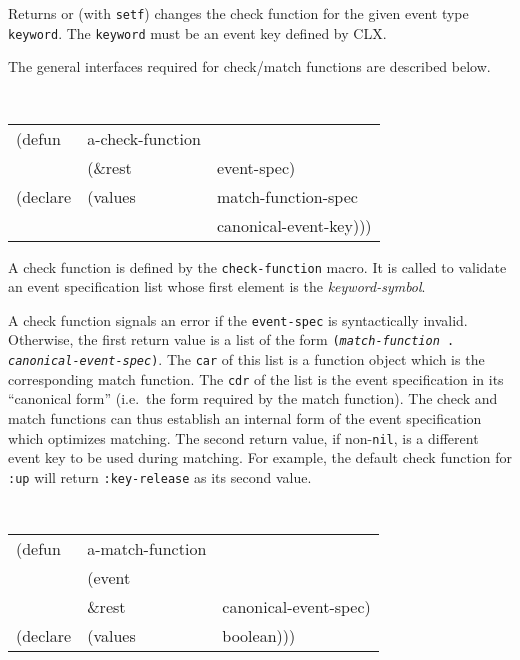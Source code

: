 \documentclass[twoside]{book}
\begin{document}
\begin{sloppy}
{\begin{flushright}
{}\end{flushright}}

\begin{flushright} \parbox[t]{6.125in}{
Returns or (with {\tt setf}) changes the check function for the given
event type {\tt keyword}. The {\tt keyword} must be an event key defined
by CLX.

}\end{flushright}


{\samepage
The general interfaces
required for  check/match functions are described below.


\begin{flushright} \parbox[t]{6.125in}{
\tt
\begin{tabular}{lll}
\raggedright
(defun & a-check-function & \\ 
& (\&rest & event-spec) \\
(declare &(values  & match-function-spec\\
         &         & canonical-event-key)))
\end{tabular}
\rm

}\end{flushright}}

\begin{flushright} \parbox[t]{6.125in}{
A check function is defined by the {\tt check-function} macro. It
is called to validate an event specification list whose first element is
the {\em keyword-symbol}.

A check function signals an error if the {\tt event-spec} is syntactically
invalid. Otherwise, the first return value
is a list of the form {\tt ({\em match-function} . {\em
canonical-event-spec})}. The {\tt car} of this list is a function
object which is the corresponding match function. The {\tt cdr} of
the list is the event
specification in its ``canonical form'' (i.e.\  the form required by the match
function). The check and match functions can thus establish an internal form of
the event specification which optimizes matching. The second return value, if
non-{\tt nil}, is a different event key to be used during matching. For example,
the default check function for {\tt :up} will return {\tt :key-release}
as its second value.

}\end{flushright}


\begin{flushright} \parbox[t]{6.125in}{
\tt
\begin{tabular}{lll}
\raggedright
(defun & a-match-function & \\ 
& (event \\
& \&rest & canonical-event-spec) \\
(declare &(values  & boolean)))
\end{tabular}
\rm

}
\end{flushright}
\end{sloppy}
\end{document}
